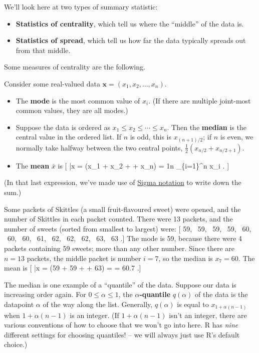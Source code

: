 \documentclass[
  letterpaper,
  DIV=11,
  numbers=noendperiod]{scrreprt}
\providecommand{\tightlist}{%
  \setlength{\itemsep}{0pt}\setlength{\parskip}{0pt}}\usepackage{longtable,booktabs,array}
\theoremstyle{remark}
\begin{document}
We'll look here at two types of summary statistic:

\begin{itemize}
\tightlist
\item
  \textbf{Statistics of centrality}, which tell us where the ``middle''
  of the data is.
\item
  \textbf{Statistics of spread}, which tell us how far the data
  typically spreads out from that middle.
\end{itemize}

Some measures of centrality are the following.

Consider some real-valued data \(\mathbf x = (x_1, x_2, \dots, x_n)\).

\begin{itemize}
\tightlist
\item
  The \textbf{mode} is the most common value of \(x_i\). (If there are
  multiple joint-most common values, they are all modes.)
\item
  Suppose the data is ordered as \(x_1 \leq x_2 \leq \cdots \leq x_n\).
  Then the \textbf{median} is the central value in the ordered list. If
  \(n\) is odd, this is \(x_{(n+1)/2}\); if \(n\) is even, we normally
  take halfway between the two central points,
  \(\frac12(x_{n/2}+x_{n/2 + 1})\).
\item
  The \textbf{mean} \(\bar x\) is {[} \bar x = (x\_1 + x\_2 +
  \cdots + x\_n) = \frac1n \sum\_\{i=1\}\^{}n x\_i . {]}
\end{itemize}

(In that last expression, we've made use of
\href{https://www.mathcentre.ac.uk/resources/workbooks/mathcentre/sigma.pdf}{Sigma
notation} to write down the sum.)

Some packets of Skittles (a small fruit-flavoured sweet) were opened,
and the number of Skittles in each packet counted. There were 13
packets, and the number of sweets (sorted from smallest to largest)
were: {[} 59, ~59, ~59, ~59, ~60, ~60, ~60, ~61, ~62, ~62, ~62, ~63, ~63
.{]} The mode is 59, because there were 4 packets containing 59 sweets;
more than any other number. Since there are \(n = 13\) packets, the
middle packet is number \(i = 7\), so the median is \(x_7 = 60\). The
mean is {[} \bar x =  (59 + 59 + \cdots + 63) =
 = 60.7 .{]}

The median is one example of a ``quantile'' of the data. Suppose our
data is increasing order again. For \(0 \leq \alpha \leq 1\), the
\textbf{\(\alpha\)-quantile} \(q(\alpha)\) of the data is the datapoint
\(\alpha\) of the way along the list. Generally, \(q(\alpha)\) is equal
to \(x_{1+\alpha(n-1)}\) when \(1+\alpha(n-1)\) is an integer. (If
\(1+\alpha(n-1)\) isn't an integer, there are various conventions of how
to choose that we won't go into here. R has \emph{nine} different
settings for choosing quantiles! -- we will always just use R's default
choice.)
\end{document}
